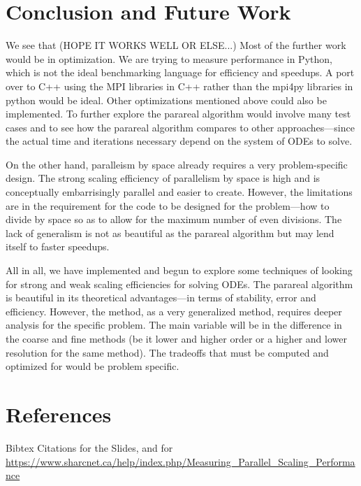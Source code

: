 \documentclass[letterpaper,twocolumn,11pt]{article}
\begin{document}
\section{Conclusion and Future Work}

We see that (HOPE IT WORKS WELL OR ELSE...) Most of the further work would be in
optimization. We are trying to measure performance in Python, which is not the
ideal benchmarking language for efficiency and speedups. A port over to C++
using the MPI libraries in C++ rather than the mpi4py libraries in python would
be ideal. Other optimizations mentioned above could also be implemented. To
further explore the parareal algorithm would involve many test cases and to see
how the parareal algorithm compares to other approaches---since the actual time
and iterations necessary depend on the system of ODEs to solve.

On the other hand, paralleism by space already requires a very problem-specific
design. The strong scaling efficiency of parallelism by space is high and is
conceptually embarrisingly parallel and easier to create. However, the
limitations are in the requirement for the code to be designed for the
problem---how to divide by space so as to allow for the maximum number of even
divisions. The lack of generalism is not as beautiful as the parareal algorithm
but may lend itself to faster speedups.

All in all, we have implemented and begun to explore some techniques of looking
for strong and weak scaling efficiencies for solving ODEs. The parareal
algorithm is beautiful in its theoretical advantages---in terms of stability,
error and efficiency. However, the method, as a very generalized method,
requires deeper analysis for the specific problem. The main variable will be in
the difference in the coarse and fine methods (be it lower and higher order or a
higher and lower resolution for the same method). The tradeoffs that must be
computed and optimized for would be problem specific.

\section{References}

Bibtex Citations for the Slides, and for \url{https://www.sharcnet.ca/help/index.php/Measuring_Parallel_Scaling_Performance}
\end{document}
